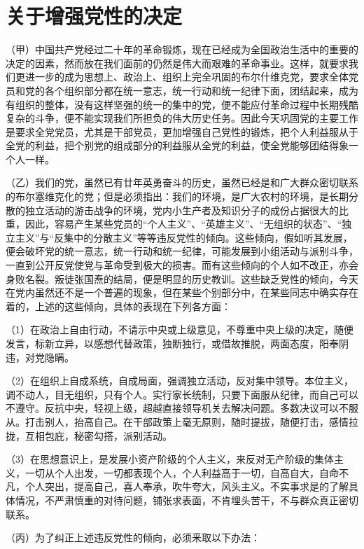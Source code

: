 \section[关于增强党性的决定（一九四一年七月一日）]{关于增强党性的决定}


（甲）中国共产党经过二十年的革命锻炼，现在已经成为全国政治生活中的重要的决定的因素，然而放在我们面前的仍然是伟大而艰难的革命事业。这样，就要求我们更进一步的成为思想上、政治上、组织上完全巩固的布尔什维克党，要求全体党员和党的各个组织部分都在统一意志，统一行动和统一纪律下面，团结起来，成为有组织的整体，没有这样坚强的统一的集中的党，便不能应付革命过程中长期残酷复杂的斗争，便不能实现我们所担负的伟大历史任务。因此今天巩固党的主要工作是要求全党党员，尤其是干部党员，更加增强自己党性的锻炼，把个人利益服从于全党的利益，把个别党的组成部分的利益服从全党的利益，使全党能够团结得象一个人一样。

（乙）我们的党，虽然已有廿年英勇奋斗的历史，虽然已经是和广大群众密切联系的布尔塞维克化的党；但是必须指出：我们的环境，是广大农村的环境，是长期分散的独立活动的游击战争的环境，党内小生产者及知识分子的成份占据很大的比重，因此，容易产生某些党员的“个人主义”、“英雄主义”、“无组织的状态”、“独立主义”与“反集中的分散主义”等等违反党性的倾向。这些倾向，假如听其发展，便会破坏党的统一意志，统一行动和统一纪律，可能发展到小组活动与派别斗争，一直到公开反党使党与革命受到极大的损害。而有这些倾向的个人如不改正，亦会身败名裂。叛徒张国焘的结局，便是明显的历史教训。这些缺乏党性的倾向，今天在党内虽然还不是一个普遍的现象，但在某些个别部分中，在某些同志中确实存在着的，上述的这些倾向，具体的表现在下列各方面：

（1）在政治上自由行动，不请示中央或上级意见，不尊重中央上级的决定，随便发言，标新立异，以感想代替政策，独断独行，或借故推脱，两面态度，阳奉阴违，对党隐瞒。

（2）在组织上自成系统，自成局面，强调独立活动，反对集中领导。本位主义，调不动人，目无组织，只有个人。实行家长统制，只要下面服从纪律，而自己可以不遵守。反抗中央，轻视上级，超越直接领导机关去解决问题。多数决议可以不服从。打击别人，抬高自己。在干部政策上毫无原则，随时提拔，随便打击，感情拉拢，互相包庇，秘密勾搭，派别活动。

（3）在思想意识上，是发展小资产阶级的个人主义，来反对无产阶级的集体主义，一切从个人出发，一切都表现个人，个人利益高于一切，自高自大，自命不凡，个人突出，提高自己，喜人奉承，吹牛夸大，风头主义。不实事求是的了解具体情况，不严肃慎重的对待问题，铺张求表面，不肯埋头苦干，不与群众真正密切联系。

（丙）为了纠正上述违反党性的倾向，必须釆取以下办法：

